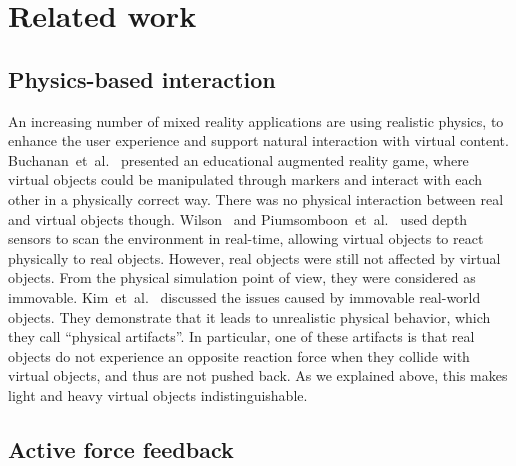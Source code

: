 \documentclass{vgtc}
\begin{document}
\section{Related work}

\subsection{Physics-based interaction}

An increasing number of mixed reality applications are using \mbox{realistic} physics, to enhance the user experience and support natural interaction with virtual content. Buchanan~et~al.~\cite{buchanan08} presented an educational augmented reality game, where virtual objects could be manipulated through markers and interact with each other in a physically correct way. There was no physical interaction between real and virtual objects though. Wilson~\cite{wilson07} and Piumsomboon~et~al.~\cite{piumsomboon11} used depth sensors to scan the environment in real-time, allowing virtual objects to react physically to real objects. However, real objects were still not affected by virtual objects. From the physical simulation point of view, they were considered as immovable. Kim~et~al.~\cite{kim11} discussed the issues caused by immovable real-world objects. They demonstrate that it leads to unrealistic physical behavior, which they call ``physical artifacts''. In particular, one of these artifacts is that real objects do not experience an opposite reaction force when they collide with virtual objects, and thus are not pushed back. As we explained above, this makes light and heavy virtual objects indistinguishable.

\subsection{Active force feedback}
\end{document}
